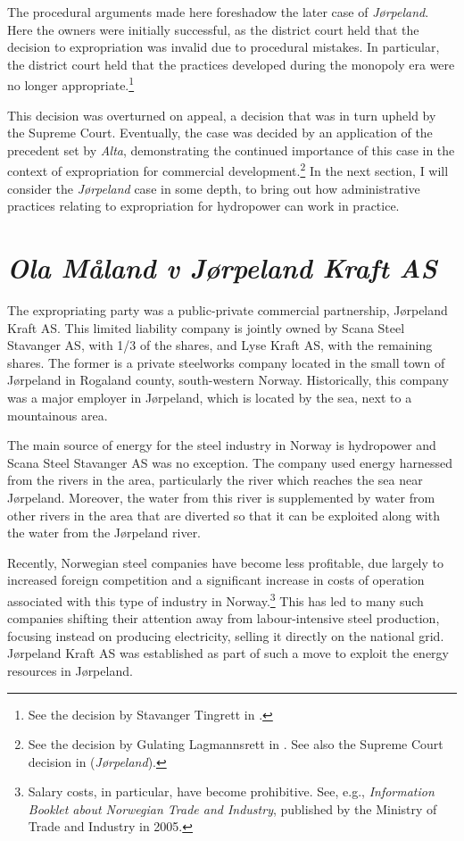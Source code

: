 The procedural arguments made here foreshadow the later case of {\it Jørpeland}. Here the owners were initially successful, as the district court held that the decision to expropriation was invalid due to procedural mistakes. In particular, the district court held that the practices  developed during the monopoly era were no longer appropriate.\footnote{See the decision by Stavanger Tingrett in \cite{jorpeland09}.} 

This decision was overturned on appeal, a decision that was in turn upheld by the Supreme Court. Eventually, the case was decided by an application of the precedent set by {\it Alta}, demonstrating the continued importance of this case in the context of expropriation for commercial development.\footnote{See the decision by Gulating Lagmannsrett in \cite{jorpeland11a}. See also the Supreme Court decision in \cite{jorpeland11} ({\it Jørpeland}).} In the next section, I will consider the {\it Jørpeland} case in some depth, to bring out how administrative practices relating to expropriation for hydropower can work in practice.

\section{{\it Ola Måland v Jørpeland Kraft AS}}\label{sec:jorpeland}

The expropriating party was a public-private commercial partnership, Jørpeland Kraft AS. This limited liability company is jointly owned by Scana Steel Stavanger AS, with 1/3 of the shares, and Lyse Kraft AS, with the remaining shares. The former is a private steelworks company located in the small town of Jørpeland in Rogaland county, south-western Norway. Historically, this company was a major employer in Jørpeland, which is located by the sea, next to a mountainous area.

The main source of energy for the steel industry in Norway is hydropower and Scana Steel Stavanger AS was no exception. The company used energy harnessed from the rivers in the area, particularly the river which reaches the sea near Jørpeland. Moreover, the water from this river is supplemented by water from other rivers in the area that are diverted so that it can be exploited along with the water from the Jørpeland river.

Recently, Norwegian steel companies have become less profitable, due largely to increased foreign competition and a significant increase in costs of operation associated with this type of industry in Norway.\footnote{Salary costs, in particular, have become prohibitive. See, e.g., \emph{Information Booklet about Norwegian Trade and Industry}, published by the Ministry of Trade and Industry in 2005.} This has led to many such companies shifting their attention away from labour-intensive steel production, focusing instead on producing electricity, selling it directly on the national grid. Jørpeland Kraft AS was established as part of such a move to exploit the energy resources in Jørpeland.


